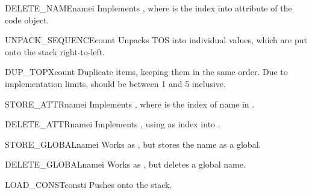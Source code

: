 \begin{opcodedesc}{DELETE_NAME}{namei}
Implements , where  is the index into
 attribute of the code object.
\end{opcodedesc}

\begin{opcodedesc}{UNPACK_SEQUENCE}{count}
Unpacks TOS into  individual values, which are put onto
the stack right-to-left.
\end{opcodedesc}



\begin{opcodedesc}{DUP_TOPX}{count}
Duplicate  items, keeping them in the same order. Due to
implementation limits,  should be between 1 and 5 inclusive.
\end{opcodedesc}

\begin{opcodedesc}{STORE_ATTR}{namei}
Implements , where  is the index
of name in .
\end{opcodedesc}

\begin{opcodedesc}{DELETE_ATTR}{namei}
Implements , using  as index into
.
\end{opcodedesc}

\begin{opcodedesc}{STORE_GLOBAL}{namei}
Works as , but stores the name as a global.
\end{opcodedesc}

\begin{opcodedesc}{DELETE_GLOBAL}{namei}
Works as , but deletes a global name.
\end{opcodedesc}


\begin{opcodedesc}{LOAD_CONST}{consti}
Pushes  onto the stack.
\end{opcodedesc}

